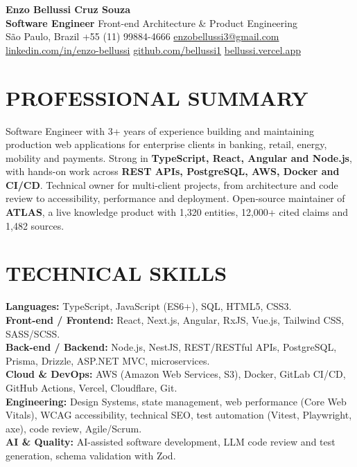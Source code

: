 ﻿\documentclass[10pt,a4paper]{article}
\begin{document}
\begin{center}
  {\fontsize{17}{19}\selectfont\textbf{Enzo Bellussi Cruz Souza}}\\[2pt]
  \small\textbf{Software Engineer} \textbar{} Front-end Architecture \& Product Engineering\\[2pt]
  \small
  S\~ao Paulo, Brazil \textbar{} +55 (11) 99884-4666 \textbar{}
  \href{mailto:enzobellussi3@gmail.com}{enzobellussi3@gmail.com}\\[1pt]
  \small
  \href{https://www.linkedin.com/in/enzo-bellussi/}{linkedin.com/in/enzo-bellussi} \textbar{}
  \href{https://github.com/bellussi1}{github.com/bellussi1} \textbar{}
  \href{https://bellussi.vercel.app/}{bellussi.vercel.app}
\end{center}

\section*{PROFESSIONAL SUMMARY}
Software Engineer with 3+ years of experience building and maintaining production web applications for enterprise clients in banking, retail, energy, mobility and payments. Strong in \textbf{TypeScript, React, Angular and Node.js}, with hands-on work across \textbf{REST APIs, PostgreSQL, AWS, Docker and CI/CD}. Technical owner for multi-client projects, from architecture and code review to accessibility, performance and deployment. Open-source maintainer of \textbf{ATLAS}, a live knowledge product with 1,320 entities, 12,000+ cited claims and 1,482 sources.

\section*{TECHNICAL SKILLS}
\textbf{Languages:} TypeScript, JavaScript (ES6+), SQL, HTML5, CSS3.\\
\textbf{Front-end / Frontend:} React, Next.js, Angular, RxJS, Vue.js, Tailwind CSS, SASS/SCSS.\\
\textbf{Back-end / Backend:} Node.js, NestJS, REST/RESTful APIs, PostgreSQL, Prisma, Drizzle, ASP.NET MVC, microservices.\\
\textbf{Cloud \& DevOps:} AWS (Amazon Web Services, S3), Docker, GitLab CI/CD, GitHub Actions, Vercel, Cloudflare, Git.\\
\textbf{Engineering:} Design Systems, state management, web performance (Core Web Vitals), WCAG accessibility, technical SEO, test automation (Vitest, Playwright, axe), code review, Agile/Scrum.\\
\textbf{AI \& Quality:} AI-assisted software development, LLM code review and test generation, schema validation with Zod.
\end{document}
